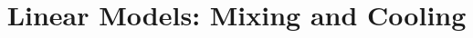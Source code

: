 \documentclass{beamer}
\title[MATH 2250 - Section 2.4]{Linear Models: Mixing and Cooling}
\begin{document}
\begin{frame}
\titlepage
\end{frame}
\end{document}

